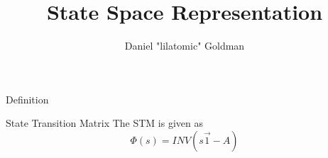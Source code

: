 \documentclass{../templates/topic}
\title{State Space Representation}
\author{Daniel "lilatomic" Goldman}
\begin{document}
\maketitle

\begin{section}{Definition}
\end{section}

\begin{section}{State Transition Matrix}
	The STM is given as
	\begin{equation}
		\Phi(s)=INV(s\vec{1}-A)
	\end{equation}
\end{section}
\end{document}

